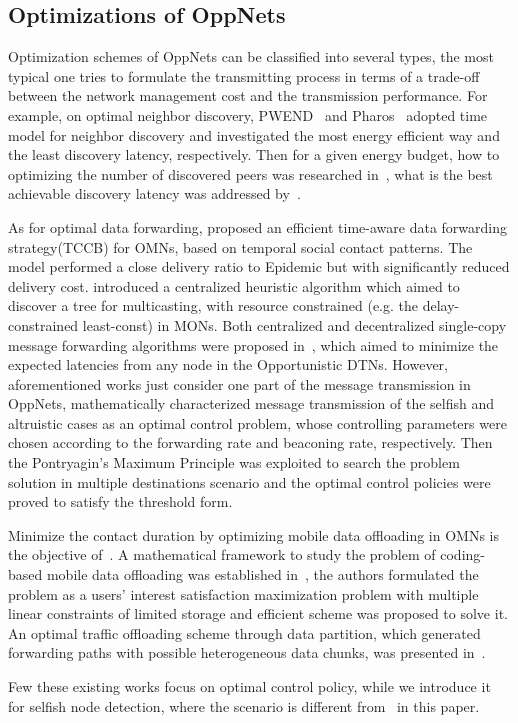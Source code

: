 \subsection{Optimizations of OppNets}
Optimization schemes of OppNets can be classified into
several types, the most typical one tries to formulate
the transmitting process in terms of a trade-off between
the network management cost and the transmission performance.
For example, on optimal neighbor discovery,
PWEND~\cite{DBLP:journals/adhoc/ChenQLLWYL20} and
Pharos~\cite{DBLP:conf/secon/Zhu00L19} adopted time model
for neighbor discovery and investigated the most energy efficient way
and the least discovery latency, respectively.
Then for a given energy budget,
how to optimizing the number of discovered peers was researched
in~\cite{DBLP:journals/tmc/LoretiB20},
what is the best achievable discovery latency was addressed
by~\cite{DBLP:conf/sigcomm/KindtC19}.

As for optimal data forwarding,
\cite{DBLP:journals/tvt/ZhouLZXF17} proposed an
efficient time-aware data forwarding strategy(TCCB) for OMNs,
 based on temporal social contact patterns.
 The model performed a close delivery ratio to
 Epidemic but with significantly reduced delivery cost.
\cite{DBLP:journals/tvt/LiuWXWLY17} introduced
a centralized heuristic algorithm
which aimed to discover a tree for multicasting,
with resource constrained (e.g. the delay-constrained least-const) in MONs.
Both centralized and decentralized single-copy message forwarding algorithms
were proposed in~\cite{DBLP:journals/tsipn/ShaghaghianC15},
which aimed to minimize the expected latencies
from any node in the Opportunistic DTNs.
However, aforementioned works just consider one part of
the message transmission in OppNets,
\cite{DBLP:journals/tcss/WuDH18} mathematically characterized
message transmission of the selfish
and altruistic cases as an optimal control problem,
whose controlling parameters were chosen according
to the forwarding rate and beaconing rate, respectively.
Then the Pontryagin's Maximum Principle was exploited
to search the problem solution in multiple destinations scenario
and the optimal control policies were proved to satisfy the threshold form.

Minimize the contact duration by optimizing
mobile data offloading in OMNs is the objective
of~\cite{DBLP:journals/tits/LiJWZ014,DBLP:conf/icc/WangW18}.
A mathematical framework to study the problem of
coding-based mobile data offloading
was established in~\cite{DBLP:journals/tits/LiJWZ014},
the authors formulated the problem as a users' interest
satisfaction maximization problem
with multiple linear constraints of
limited storage and efficient scheme
was proposed to solve it.
An optimal traffic offloading scheme through
data partition, which generated forwarding paths
with possible heterogeneous data chunks,
was presented in~\cite{DBLP:conf/icc/WangW18}.

Few these existing works focus on
optimal control policy, while we introduce it
for selfish node detection,
where the scenario is different from~\cite{DBLP:journals/tcss/WuDH18} in this paper.
